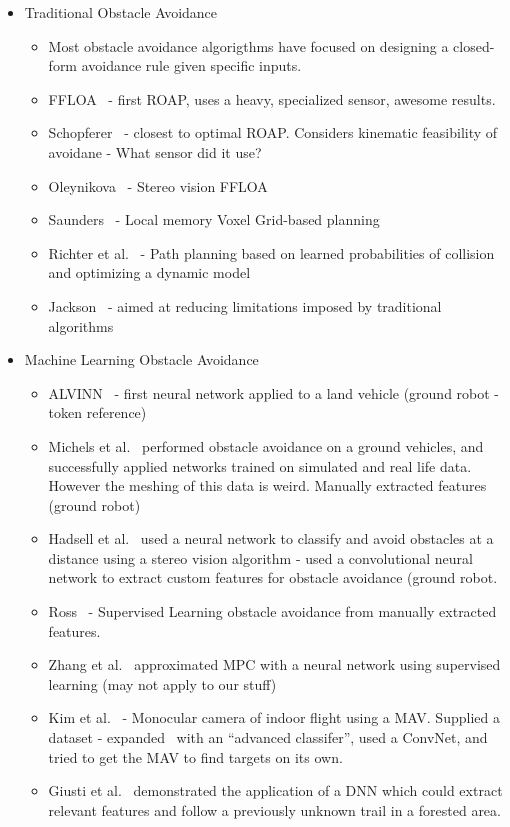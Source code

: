 \documentclass[paper=a4, fontsize=11pt]{scrartcl} %
\begin{document}
		\begin{itemize}
			\item Traditional Obstacle Avoidance
			\begin{itemize}
				\item Most obstacle avoidance algorigthms have focused on designing a closed-form avoidance rule given specific inputs.
				\item FFLOA~\cite{Scherer2007} - first ROAP, uses a heavy, specialized sensor, awesome results.
				\item Schopferer~\cite{Schopferer2014} - closest to optimal ROAP.  Considers kinematic feasibility of avoidane - What sensor did it use?
				\item Oleynikova~\cite{Oleynikova2015} - Stereo vision FFLOA
				\item Saunders~\cite{Saunders2009} - Local memory Voxel Grid-based planning
				\item Richter et al.~\cite{Richter2014} - Path planning based on learned probabilities of collision and optimizing a dynamic model
				\item Jackson~\cite{CEPA} - aimed at reducing limitations imposed by traditional algorithms
			\end{itemize}
			\item Machine Learning Obstacle Avoidance
			\begin{itemize}			
				\item ALVINN~\cite{Pomerleau1989} - first neural network applied to a land vehicle (ground robot - token reference)
				\item Michels et al.~\cite{Michels2005} performed obstacle avoidance on a ground vehicles, and successfully applied networks trained on simulated and real life data.  However the meshing of this data is weird.  Manually extracted features (ground robot)
				\item Hadsell et al.~\cite{Hadsell2009} used a neural network to classify and avoid obstacles at a distance using a stereo vision algorithm - used a convolutional neural network to extract custom features for obstacle avoidance (ground robot.
				\item Ross~\cite{Ross2013} - Supervised Learning obstacle avoidance from manually extracted features.
				\item Zhang et al.~\cite{Zhang2015} approximated MPC with a neural network using supervised learning (may not apply to our stuff)
				\item Kim et al.~\cite{Kim2015} - Monocular camera of indoor flight using a MAV.  Supplied a dataset - expanded~\cite{Ross2013} with an ``advanced classifer'', used a ConvNet, and tried to get the MAV to find targets on its own.
				\item Giusti et al.~\cite{Guisti2016} demonstrated the application of a DNN which could extract relevant features and follow a previously unknown trail in a forested area.

			\end{itemize}
		\end{itemize}
\end{document}
